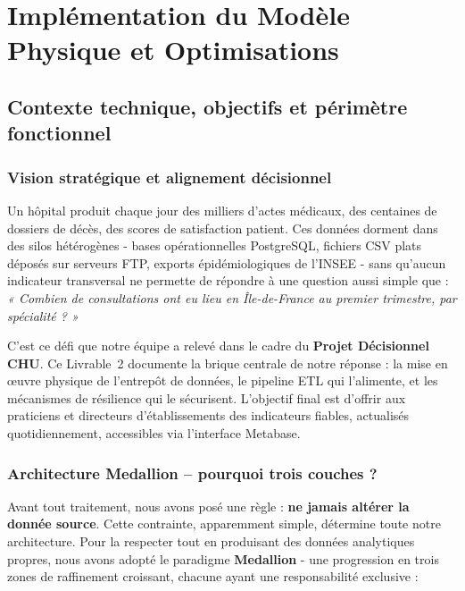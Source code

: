 \documentclass[12pt,a4paper]{report}
\begin{document}
\tableofcontents
\clearpage

{%
  \hypersetup{linkcolor=black}%
  \listoffigures
  \clearpage
  \listoftables
  \clearpage
}

\chapter{Implémentation du Modèle Physique et Optimisations}

\section{Contexte technique, objectifs et périmètre fonctionnel}
\label{sec:contexte}

\subsection{Vision stratégique et alignement décisionnel}
Un hôpital produit chaque jour des milliers d'actes médicaux, des centaines de dossiers de décès, des scores de satisfaction patient. Ces données dorment dans des silos hétérogènes - bases opérationnelles PostgreSQL, fichiers CSV plats déposés sur serveurs FTP, exports épidémiologiques de l'INSEE - sans qu'aucun indicateur transversal ne permette de répondre à une question aussi simple que : \textit{« Combien de consultations ont eu lieu en Île-de-France au premier trimestre, par spécialité ? »}

C'est ce défi que notre équipe a relevé dans le cadre du \textbf{Projet Décisionnel CHU}. Ce Livrable~2 documente la brique centrale de notre réponse : la mise en \oe uvre physique de l'entrepôt de données, le pipeline ETL qui l'alimente, et les mécanismes de résilience qui le sécurisent. L'objectif final est d'offrir aux praticiens et directeurs d'établissements des indicateurs fiables, actualisés quotidiennement, accessibles via l'interface Metabase.

\subsection{Architecture Medallion -- pourquoi trois couches ?}
Avant tout traitement, nous avons posé une règle : \textbf{ne jamais altérer la donnée source}. Cette contrainte, apparemment simple, détermine toute notre architecture. Pour la respecter tout en produisant des données analytiques propres, nous avons adopté le paradigme \textbf{Medallion} - une progression en trois zones de raffinement croissant, chacune ayant une responsabilité exclusive :
\end{document}
